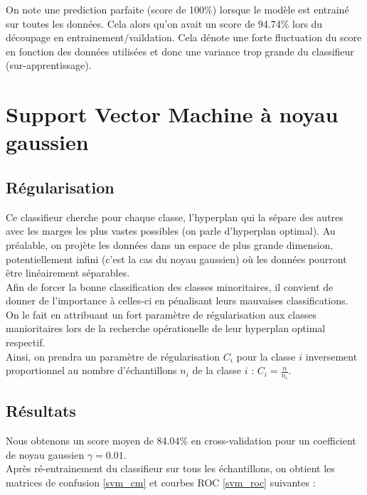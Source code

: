 \documentclass{book}
\begin{document}
On note une prediction parfaite (score de 100\%) lorsque le modèle est entrainé sur toutes les données. Cela alors qu'on avait un score de 94.74\% lors du découpage en entrainement/vaildation. Cela dénote une forte fluctuation 
du score en fonction des données utilisées et donc une variance trop grande du classifieur (sur-apprentissage).

\section{Support Vector Machine à noyau gaussien}

\subsection{Régularisation}

Ce classifieur cherche pour chaque classe, l'hyperplan qui la sépare des autres avec les marges les plus vastes possibles (on parle d'hyperplan optimal). Au préalable, on projète les données dans un espace de plus grande 
dimension, potentiellement infini (c'est la cas du noyau gaussien) où les données pourront être linéairement séparables.\\
Afin de forcer la bonne classification des classes minoritaires, il convient de donner de l'importance à celles-ci en pénalisant leurs mauvaises classifications. On le fait en attribuant un fort paramètre de régularisation 
aux classes manioritaires lors de la recherche opérationelle de leur hyperplan optimal respectif.\\
Ainsi, on prendra un paramètre de régularisation $C_{i}$ pour la classe $i$ inversement proportionnel au nombre d'échantillons $n_{i}$ de la classe $i$ : $C_{i} = \frac{n}{n_i}$.\\

\subsection{Résultats}

Nous obtenons un score moyen de 84.04\% en cross-validation pour un coefficient de noyau gaussien $\gamma = 0.01$. \\
Après ré-entrainement du classifieur sur tous les échantillons, on obtient les matrices de confusion \ref{svm_cm} et courbes ROC \ref{svm_roc} suivantes :
\end{document}

